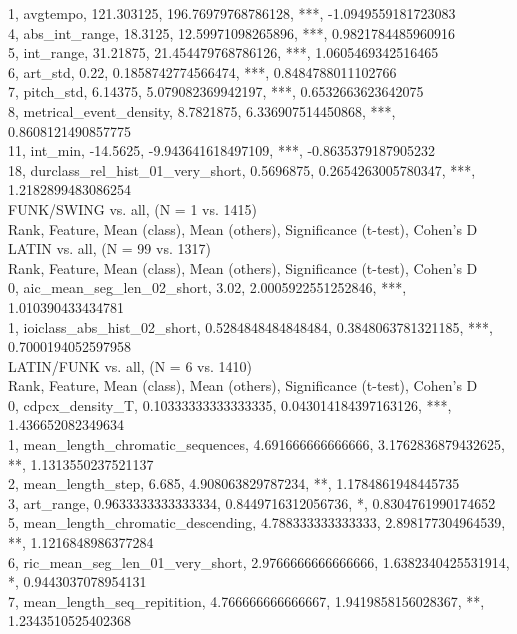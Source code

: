 1, avgtempo, 121.303125, 196.76979768786128, ***, -1.0949559181723083\\
4, abs_int_range, 18.3125, 12.59971098265896, ***, 0.9821784485960916\\
5, int_range, 31.21875, 21.454479768786126, ***, 1.0605469342516465\\
6, art_std, 0.22, 0.1858742774566474, ***, 0.8484788011102766\\
7, pitch_std, 6.14375, 5.079082369942197, ***, 0.6532663623642075\\
8, metrical_event_density, 8.7821875, 6.336907514450868, ***, 0.8608121490857775\\
11, int_min, -14.5625, -9.943641618497109, ***, -0.8635379187905232\\
18, durclass_rel_hist_01_very_short, 0.5696875, 0.2654263005780347, ***, 1.2182899483086254\\
FUNK/SWING vs. all, (N = 1 vs. 1415)\\
Rank, Feature, Mean (class), Mean (others), Significance (t-test), Cohen's D\\
LATIN vs. all, (N = 99 vs. 1317)\\
Rank, Feature, Mean (class), Mean (others), Significance (t-test), Cohen's D\\
0, aic_mean_seg_len_02_short, 3.02, 2.0005922551252846, ***, 1.010390433434781\\
1, ioiclass_abs_hist_02_short, 0.5284848484848484, 0.3848063781321185, ***, 0.7000194052597958\\
LATIN/FUNK vs. all, (N = 6 vs. 1410)\\
Rank, Feature, Mean (class), Mean (others), Significance (t-test), Cohen's D\\
0, cdpcx_density_T, 0.10333333333333335, 0.043014184397163126, ***, 1.436652082349634\\
1, mean_length_chromatic_sequences, 4.691666666666666, 3.1762836879432625, **, 1.1313550237521137\\
2, mean_length_step, 6.685, 4.908063829787234, **, 1.1784861948445735\\
3, art_range, 0.9633333333333334, 0.8449716312056736, *, 0.8304761990174652\\
5, mean_length_chromatic_descending, 4.788333333333333, 2.898177304964539, **, 1.1216848986377284\\
6, ric_mean_seg_len_01_very_short, 2.9766666666666666, 1.6382340425531914, *, 0.9443037078954131\\
7, mean_length_seq_repitition, 4.766666666666667, 1.9419858156028367, **, 1.2343510525402368\\
